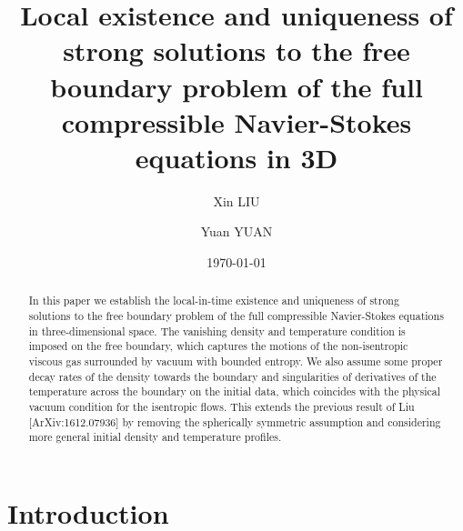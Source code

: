 \documentclass[12pt,a4paper]{amsart}
\numberwithin{equation}{section}
\theoremstyle{plain}
\theoremstyle{definition}
\begin{document}
\title[Local theory of Free boundary problem of the FNS in 3D]{Local existence and uniqueness of strong solutions to the free boundary problem of the full compressible Navier-Stokes equations in 3D}



\author[X. Liu]{Xin LIU}
\address[X. Liu]{Department of Mathematics, Texas A\&M University, College Station, TX, United States}

\author[Y. Yuan]{Yuan YUAN}
\address[Y. Yuan]{The Institute of Mathematical Sciences \& Department of Mathematics, The Chinese University of Hong Kong,	Shatin, N.T., Hong Kong}







\date{\today}

\begin{abstract}
In this paper we establish the local-in-time existence and uniqueness of strong solutions to the free boundary problem of the full compressible Navier-Stokes equations in three-dimensional space.
The vanishing density and temperature condition is imposed on the free boundary, which captures the motions of the non-isentropic viscous gas surrounded by vacuum with bounded entropy.
We also assume some proper decay rates of the density towards the boundary and singularities of derivatives of the temperature across the boundary on the initial data, which coincides with the physical vacuum condition for the isentropic flows.
This extends the previous result of Liu [ArXiv:1612.07936] by removing the spherically symmetric assumption and considering more general initial density and temperature profiles.
\end{abstract}

\maketitle



\section{Introduction}
\end{document}
